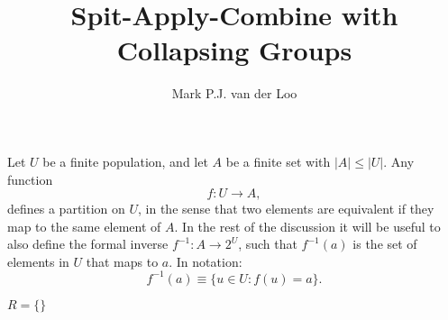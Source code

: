 \documentclass[11pt, fleqn]{article}
\title{Spit-Apply-Combine with Collapsing Groups}
\author{Mark P.J. van der Loo}
\begin{document}
\maketitle

Let $U$ be a finite population, and let $A$ be a finite set with $|A|\leq |U|$.
Any function 
\begin{equation}
f: U\to A,
\end{equation}
defines a partition on $U$, in the sense that two elements are equivalent if they
map to the same element of $A$. In the rest of the discussion it will be useful to 
also define the formal inverse $f^{-1}:A\to 2^U$, such that $f^{-1}(a)$ is the set of 
elements in $U$ that maps to $a$. In notation:
\begin{equation}
f^{-1}(a) \equiv \{u\in U: f(u)=a\}.
\end{equation}

\begin{algorithm}[H]

$R = \{\}$\;

\end{algorithm}




\end{document}
